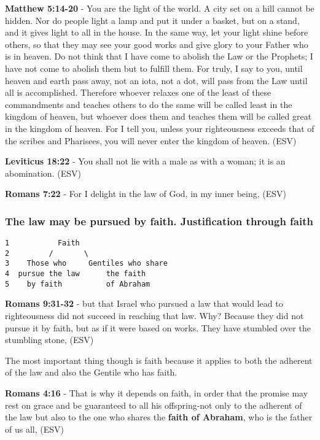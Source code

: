 \documentclass[11pt]{article}
\begin{document}
\textbf{Matthew 5:14-20} - You are the light of the world. A city set on a hill cannot be hidden. Nor do people light a lamp and put it under a basket, but on a stand, and it gives light to all in the house. In the same way, let your light shine before others, so that they may see your good works and give glory to your Father who is in heaven. Do not think that I have come to abolish the Law or the Prophets; I have not come to abolish them but to fulfill them. For truly, I say to you, until heaven and earth pass away, not an iota, not a dot, will pass from the Law until all is accomplished. Therefore whoever relaxes one of the least of these commandments and teaches others to do the same will be called least in the kingdom of heaven, but whoever does them and teaches them will be called great in the kingdom of heaven. For I tell you, unless your righteousness exceeds that of the scribes and Pharisees, you will never enter the kingdom of heaven. (ESV)

\textbf{Leviticus 18:22} - You shall not lie with a male as with a woman; it is an abomination. (ESV)

\textbf{Romans 7:22} - For I delight in the law of God, in my inner being, (ESV)

\subsubsection{The law may be pursued by faith. Justification through faith}
\label{sec:orge347545}

\begin{verbatim}
1           Faith
2         /       \
3    Those who     Gentiles who share
4  pursue the law      the faith
5    by faith          of Abraham
\end{verbatim}

\textbf{Romans 9:31-32} - but that Israel who pursued a law that would lead to righteousness did not succeed in reaching that law. Why? Because they did not pursue it by faith, but as if it were based on works. They have stumbled over the stumbling stone, (ESV)

The most important thing though is faith because it applies to both the adherent of the law and also the Gentile who has faith.

\textbf{Romans 4:16} - That is why it depends on faith, in order that the promise may rest on grace and be guaranteed to all his offspring-not only to the adherent of the law but also to the one who shares the \textbf{faith of Abraham}, who is the father of us all, (ESV)
\end{document}
